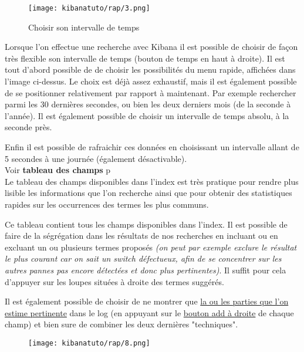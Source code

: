 \begin{figure}[H]
\center
\texttt{[image: kibanatuto/rap/3.png]}
\label{fig:kibanatuto3}
\caption{Choisir son intervalle de temps}
\end{figure}
Lorsque l'on effectue une recherche avec Kibana il est possible de choisir de façon
très flexible son intervalle de temps (bouton de temps en haut à droite).
Il est tout d'abord possible de de choisir les possibilités du menu rapide, affichées
dans l'image ci-dessus. Le choix est déjà assez exhaustif, mais il est également 
possible de se positionner relativement par rapport à maintenant. Par exemple rechercher 
parmi les 30 dernières secondes, ou bien les deux derniers mois (de la seconde à 
l'année). Il est également possible de choisir un intervalle de temps absolu, à 
la seconde près.

Enfin il est possible de rafraichir ces données en choisissant un intervalle allant
de 5 secondes à une journée (également désactivable).\\[2mm]
Voir \textbf{tableau des champs} p\pageref{fig:kibanatuto4}\\[2mm]

Le tableau des champs disponibles dans l'index est très pratique pour rendre plus 
lisible les informations que l'on recherche ainsi que pour obtenir des statistiques 
rapides sur les occurrences des termes les plus communs.

Ce tableau contient tous les champs disponibles dans l'index. Il est possible de
faire de la ségrégation dans les résultats de nos recherches en incluant ou en   
excluant un ou plusieurs termes proposés {\footnotesize\textit{(on peut par exemple exclure le résultat 
le plus courant car on sait un switch défectueux, afin de se concentrer sur les autres
pannes pas encore détectées et donc plus pertinentes)}}. Il suffit pour cela d'appuyer
sur les loupes situées à droite des termes suggérés.


Il est également possible de choisir de ne montrer que \hyperref[fig:kibanatuto6]{la ou les parties que l'on 
estime pertinente} dans le log (en appuyant sur le \hyperref[fig:kibanatuto5]{bouton 
add à droite} de chaque champ) et bien sure de combiner les deux dernières "techniques".
\begin{figure}[H]
\begin{flushright}
\texttt{[image: kibanatuto/rap/8.png]}
\label{fig:kibanatuto5}
\end{flushright}%
\end{figure}

